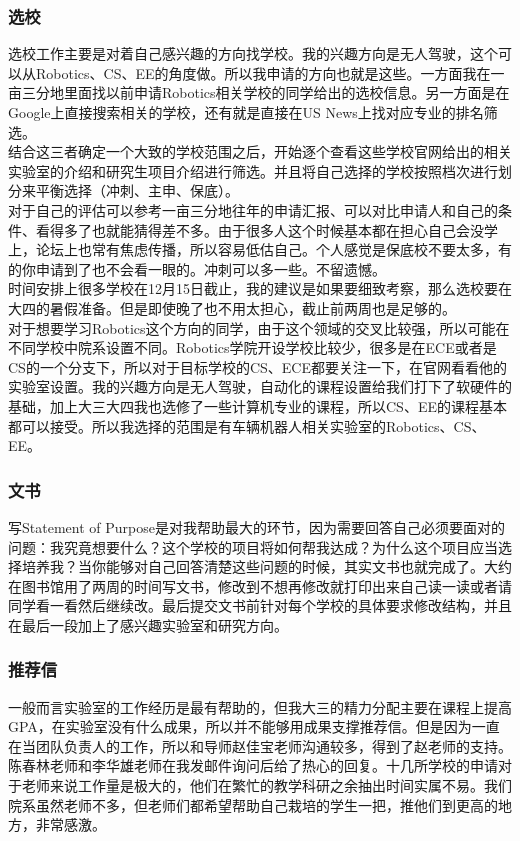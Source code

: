 \documentclass[a4paper,UTF8]{book}
\begin{document}
        \subsubsection*{选校}
        选校工作主要是对着自己感兴趣的方向找学校。我的兴趣方向是无人驾驶，这个可以从Robotics、CS、EE的角度做。所以我申请的方向也就是这些。一方面我在一亩三分地里面找以前申请Robotics相关学校的同学给出的选校信息。另一方面是在Google上直接搜索相关的学校，还有就是直接在US News上找对应专业的排名筛选。\\
        结合这三者确定一个大致的学校范围之后，开始逐个查看这些学校官网给出的相关实验室的介绍和研究生项目介绍进行筛选。并且将自己选择的学校按照档次进行划分来平衡选择（冲刺、主申、保底）。\\
        对于自己的评估可以参考一亩三分地往年的申请汇报、可以对比申请人和自己的条件、看得多了也就能猜得差不多。由于很多人这个时候基本都在担心自己会没学上，论坛上也常有焦虑传播，所以容易低估自己。个人感觉是保底校不要太多，有的你申请到了也不会看一眼的。冲刺可以多一些。不留遗憾。\\
        时间安排上很多学校在12月15日截止，我的建议是如果要细致考察，那么选校要在大四的暑假准备。但是即使晚了也不用太担心，截止前两周也是足够的。\\
        对于想要学习Robotics这个方向的同学，由于这个领域的交叉比较强，所以可能在不同学校中院系设置不同。Robotics学院开设学校比较少，很多是在ECE或者是CS的一个分支下，所以对于目标学校的CS、ECE都要关注一下，在官网看看他的实验室设置。我的兴趣方向是无人驾驶，自动化的课程设置给我们打下了软硬件的基础，加上大三大四我也选修了一些计算机专业的课程，所以CS、EE的课程基本都可以接受。所以我选择的范围是有车辆机器人相关实验室的Robotics、CS、EE。
        
        \subsubsection*{文书}
        写Statement of Purpose是对我帮助最大的环节，因为需要回答自己必须要面对的问题：我究竟想要什么？这个学校的项目将如何帮我达成？为什么这个项目应当选择培养我？当你能够对自己回答清楚这些问题的时候，其实文书也就完成了。大约在图书馆用了两周的时间写文书，修改到不想再修改就打印出来自己读一读或者请同学看一看然后继续改。最后提交文书前针对每个学校的具体要求修改结构，并且在最后一段加上了感兴趣实验室和研究方向。

        \subsubsection*{推荐信}
        一般而言实验室的工作经历是最有帮助的，但我大三的精力分配主要在课程上提高GPA，在实验室没有什么成果，所以并不能够用成果支撑推荐信。但是因为一直在当团队负责人的工作，所以和导师赵佳宝老师沟通较多，得到了赵老师的支持。陈春林老师和李华雄老师在我发邮件询问后给了热心的回复。十几所学校的申请对于老师来说工作量是极大的，他们在繁忙的教学科研之余抽出时间实属不易。我们院系虽然老师不多，但老师们都希望帮助自己栽培的学生一把，推他们到更高的地方，非常感激。
\end{document}
